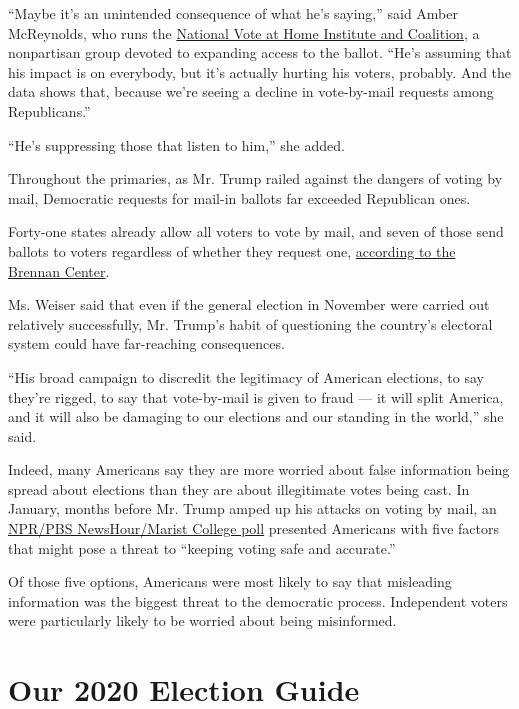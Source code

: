 ``Maybe it's an unintended consequence of what he's saying,'' said Amber
McReynolds, who runs the
\href{https://www.voteathome.org/about/}{National Vote at Home Institute
and Coalition}, a nonpartisan group devoted to expanding access to the
ballot. ``He's assuming that his impact is on everybody, but it's
actually hurting his voters, probably. And the data shows that, because
we're seeing a decline in vote-by-mail requests among Republicans.''

``He's suppressing those that listen to him,'' she added.

Throughout the primaries, as Mr. Trump railed against the dangers of
voting by mail, Democratic requests for mail-in ballots far exceeded
Republican ones.

Forty-one states already allow all voters to vote by mail, and seven of
those send ballots to voters regardless of whether they request one,
\href{https://www.brennancenter.org/our-work/research-reports/preparing-your-state-election-under-pandemic-conditions}{according
to the Brennan Center}.

Ms. Weiser said that even if the general election in November were
carried out relatively successfully, Mr. Trump's habit of questioning
the country's electoral system could have far-reaching consequences.

``His broad campaign to discredit the legitimacy of American elections,
to say they're rigged, to say that vote-by-mail is given to fraud --- it
will split America, and it will also be damaging to our elections and
our standing in the world,'' she said.

Indeed, many Americans say they are more worried about false information
being spread about elections than they are about illegitimate votes
being cast. In January, months before Mr. Trump amped up his attacks on
voting by mail, an
\href{http://maristpoll.marist.edu/wp-content/uploads/2020/01/NPR_PBS-NewsHour_Marist-Poll_USA-Written-Summary-of-Findings_2001141253.pdf}{NPR/PBS
NewsHour/Marist College poll} presented Americans with five factors that
might pose a threat to ``keeping voting safe and accurate.''

Of those five options, Americans were most likely to say that misleading
information was the biggest threat to the democratic process.
Independent voters were particularly likely to be worried about being
misinformed.

\hypertarget{our-2020-election-guide}{%
\section{Our 2020 Election Guide}\label{our-2020-election-guide}}

